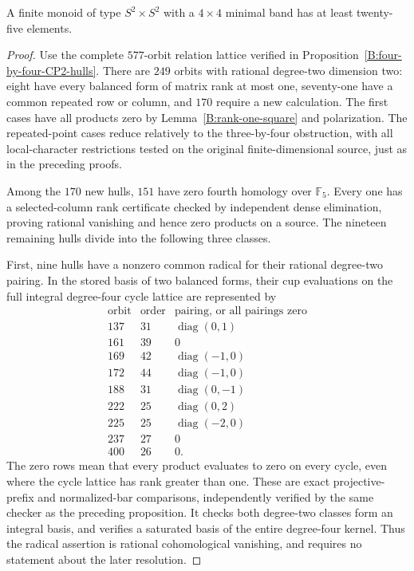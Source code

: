 \begin{proposition}\label{B:four-by-four-product25}
A finite monoid of type $S^2\times S^2$ with a $4\times4$
minimal band has at least twenty-five elements.
\end{proposition}
\begin{proof}
Use the complete $577$-orbit relation lattice verified in
Proposition~\ref{B:four-by-four-CP2-hulls}.  There are $249$
orbits with rational degree-two dimension two: eight have every
balanced form of matrix rank at most one, seventy-one have a
common repeated row or column, and $170$ require a new calculation.
The first cases have all products zero by
Lemma~\ref{B:rank-one-square} and polarization.  The repeated-point
cases reduce relatively to the three-by-four obstruction, with all
local-character restrictions tested on the original finite-dimensional
source, just as in the preceding proofs.

Among the $170$ new hulls, $151$ have zero fourth homology over
$\mathbb F_5$.  Every one has a selected-column rank certificate
checked by independent dense elimination, proving rational vanishing
and hence zero products on a source.  The nineteen remaining hulls
divide into the following three classes.

First, nine hulls have a nonzero common radical for their rational
degree-two pairing.  In the stored basis of two balanced forms,
their cup evaluations on the full integral degree-four cycle lattice
are represented by
\[
\begin{array}{c|r|c}
\text{orbit}&\text{order}&\text{pairing, or all pairings zero}\\\hline
137&31&\operatorname{diag}(0,1)\\
161&39&0\\
169&42&\operatorname{diag}(-1,0)\\
172&44&\operatorname{diag}(-1,0)\\
188&31&\operatorname{diag}(0,-1)\\
222&25&\operatorname{diag}(0,2)\\
225&25&\operatorname{diag}(-2,0)\\
237&27&0\\
400&26&0.
\end{array}
\]
The zero rows mean that every product evaluates to zero on every
cycle, even where the cycle lattice has rank greater than one.
These are exact projective-prefix and normalized-bar comparisons,
independently verified by the same checker as the preceding
proposition.  It checks both degree-two classes form an integral
basis, and verifies a saturated basis of the entire degree-four
kernel.  Thus the radical assertion is rational cohomological
vanishing, and requires no statement about the later resolution.


\end{proof}

